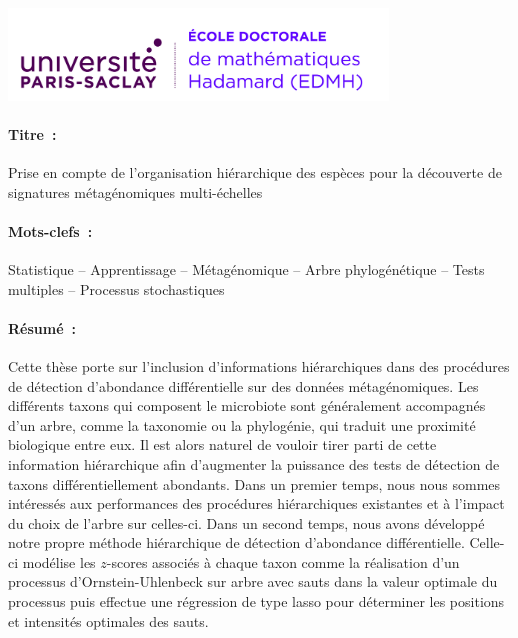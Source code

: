 \documentclass[12pt,a4paper]{reedthesis}
\theoremstyle{definition}
\theoremstyle{definition}
\theoremstyle{definition}
\theoremstyle{remark}
\begin{document}
\noindent
\includegraphics[height=2.45cm]{logos/edmh.jpg}
\vspace{1cm}
\begin{mdframed}[linecolor=Prune,linewidth=1]
\vspace{-.25cm}
\paragraph*{Titre~:} Prise en compte de l'organisation hiérarchique des espèces pour la découverte de signatures métagénomiques multi-échelles
\begin{small}
\vspace{-.25cm}
\paragraph*{Mots-clefs~:} Statistique -- Apprentissage -- Métagénomique -- Arbre phylogénétique -- Tests multiples -- Processus stochastiques

\vspace{-.5cm}
\begin{multicols}{2}
\paragraph*{Résumé~:} Cette thèse porte sur l'inclusion d'informations hiérarchiques dans des procédures
de détection d'abondance différentielle sur des données métagénomiques. Les différents
taxons qui composent le microbiote sont généralement accompagnés d'un arbre, comme la
taxonomie ou la phylogénie, qui traduit une proximité biologique entre eux.
Il est alors naturel de vouloir tirer parti de cette information hiérarchique afin
d'augmenter la puissance des tests de détection de taxons différentiellement
abondants. Dans un premier temps, nous nous sommes intéressés aux performances des
procédures hiérarchiques existantes et à l'impact du choix de l'arbre sur celles-ci.
Dans un second temps, nous avons développé notre propre méthode hiérarchique de
détection d'abondance différentielle. Celle-ci modélise les \(z\)-scores associés
à chaque taxon comme la réalisation d'un processus d'Ornstein-Uhlenbeck sur arbre
avec sauts dans la valeur optimale du processus puis effectue une régression de type lasso
pour déterminer les positions et intensités optimales des sauts.
\end{multicols}
\end{small}
\end{mdframed}
\end{document}
